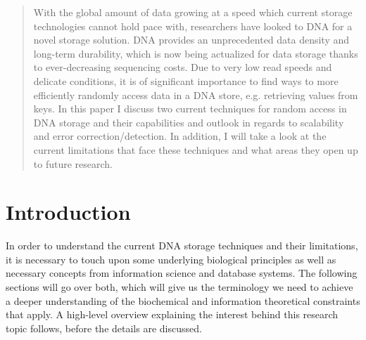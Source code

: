 \documentclass[a4paper,conference]{IEEEtran}
\begin{document}
\begin{abstract}
With the global amount of data growing at a speed which current storage technologies cannot hold pace with, researchers have looked to DNA for a novel storage solution. DNA provides an unprecedented data density and long-term durability, which is now being actualized for data storage thanks to ever-decreasing sequencing costs. Due to very low read speeds and delicate conditions, it is of significant importance to find ways to more efficiently randomly access data in a DNA store, e.g. retrieving values from keys. In this paper I discuss two current techniques for random access in DNA storage and their capabilities and outlook in regards to scalability and error correction/detection. In addition, I will take a look at the current limitations that face these techniques and what areas they open up to future research.
\end{abstract}





%
\IEEEpeerreviewmaketitle



\section{Introduction}
In order to understand the current DNA storage techniques and their limitations, it is necessary to touch upon some underlying biological principles as well as necessary concepts from information science and database systems. The following sections will go over both, which will give us the terminology we need to achieve a deeper understanding of the biochemical and information theoretical constraints that apply. A high-level overview explaining the interest behind this research topic follows, before the details are discussed.
\end{document}
